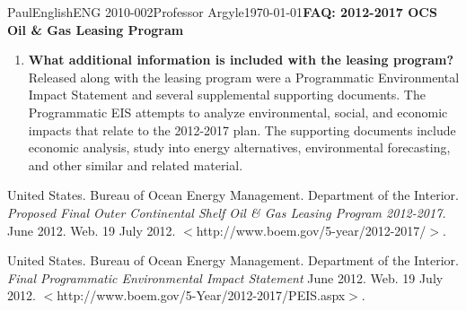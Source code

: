 \documentclass[12pt,letterpaper]{article}
\begin{document}
\begin{mla}{Paul}{English}{ENG 2010-002}{Professor Argyle}{\today}{\textbf{FAQ: 2012-2017 OCS Oil \& Gas Leasing Program}}
\begin{enumerate}
\item \textbf{What additional information is included with the leasing program?}\newline
Released along with the leasing program were a Programmatic Environmental Impact Statement and several supplemental supporting documents. The Programmatic EIS attempts to analyze environmental, social, and economic impacts that relate to the 2012-2017 plan. The supporting documents include economic analysis, study into energy alternatives, environmental forecasting, and other similar and related material.

\end{enumerate}


\begin{workscited}

\bibent
United States. Bureau of Ocean Energy Management. Department of the Interior. \textit{Proposed Final Outer Continental Shelf Oil \& Gas Leasing Program 2012-2017.} June 2012. Web. 19 July 2012. $<$http://www.boem.gov/5-year/2012-2017/$>$.

\bibent
United States. Bureau of Ocean Energy Management. Department of the Interior. \textit{Final Programmatic Environmental Impact Statement} June 2012. Web. 19 July 2012. $<$http://www.boem.gov/5-Year/2012-2017/PEIS.aspx$>$.



\end{workscited}
\end{mla}
\end{document}
